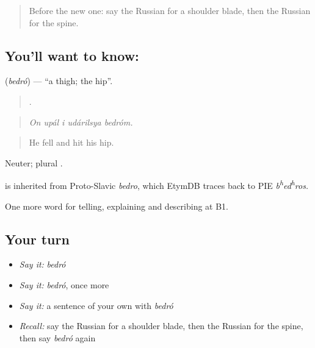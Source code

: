 \label{lesson:RU-C481-bedro}



\begin{quote}
Before the new one: say the Russian for a shoulder blade, then the Russian for the spine.
\end{quote}

\subsection*{You'll want to know: }
\textbf{} (\emph{bedró}) — \textquotedblleft{}a thigh; the hip\textquotedblright{}.

\begin{quote}
    .
\end{quote}

\begin{quote}
\emph{On upál i udárilsya bedróm.}
\end{quote}

\begin{quote}
He fell and hit his hip.
\end{quote}

Neuter; plural .

\begin{cousinweb}
\emph{} is inherited from Proto-Slavic \emph{bedro}, which EtymDB traces back to PIE \emph{b\textsuperscript{h}ed\textsuperscript{h}ros.}
\end{cousinweb}

\begin{grammarlens}[title={What you've built}]
One more word for telling, explaining and describing at B1.
\end{grammarlens}

\subsection*{Your turn}
\begin{itemize}
\raggedright
  \item \emph{Say it:} \emph{bedró}
  \item \emph{Say it:} \emph{bedró}, once more
  \item \emph{Say it:} a sentence of your own with \emph{bedró}
  \item \emph{Recall:} say the Russian for a shoulder blade, then the Russian for the spine, then say \emph{bedró} again
\end{itemize}

